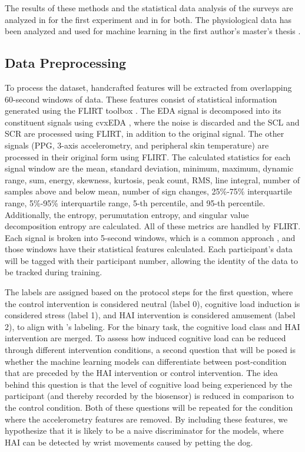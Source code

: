 \documentclass[12pt]{iopart}
\begin{document}
The results of these methods and the statistical data analysis of the surveys are analyzed in \cite{thayer2022effects} for the first experiment and in \cite{Stevens2020EffectsOH} for both.  The physiological data has been analyzed and used for machine learning in the first author's master's thesis \cite{arce2023unobtrusive}.  

\subsection*{Data Preprocessing}

To process the dataset, handcrafted features will be extracted from overlapping 60-second windows of data.  These features consist of statistical information generated using the FLIRT toolbox \cite{foll2021flirt}.  The EDA signal is decomposed into its constituent signals using cvxEDA \cite{greco2015cvxeda}, where the noise is discarded and the SCL and SCR are processed using FLIRT, in addition to the original signal.  The other signals (PPG, 3-axis accelerometry, and peripheral skin temperature) are processed in their original form using FLIRT.  The calculated statistics for each signal window are the mean, standard deviation, minimum, maximum, dynamic range, sum, energy, skewness, kurtosis, peak count, RMS, line integral, number of samples above and below mean, number of sign changes, 25\%-75\% interquartile range, 5\%-95\% interquartile range, 5-th percentile, and 95-th percentile.  Additionally, the entropy, perumutation entropy, and singular value decomposition entropy are calculated.  All of these metrics are handled by FLIRT\cite{foll2021flirt}. Each signal is broken into 5-second windows, which is a common approach \cite{schmidt2018introducing, phippsassessing}, and those windows have their statistical features calculated.  Each participant's data will be tagged with their participant number, allowing the identity of the data to be tracked during training. 

The labels are assigned based on the protocol steps for the first question, where the control intervention is considered neutral (label 0), cognitive load induction is considered stress (label 1), and HAI intervention is considered amusement (label 2), to align with \cite{schmidt2018introducing}'s labeling.  For the binary task, the cognitive load class and HAI intervention are merged.  To assess how induced cognitive load can be reduced through different intervention conditions, a second question that will be posed is whether the machine learning models can differentiate between post-condition that are preceded by the HAI intervention or control intervention.  The idea behind this question is that the level of cognitive load being experienced by the participant (and thereby recorded by the biosensor) is reduced in comparison to the control condition.  Both of these questions will be repeated for the condition where the accelerometry features are removed.  By including these features, we hypothesize that it is likely to be a naive discriminator for the models, where HAI can be detected by wrist movements caused by petting the dog.
\end{document}

